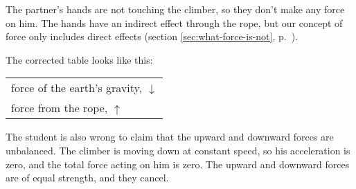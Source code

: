 The partner's hands are not touching the climber, so they don't make any force
on him. The hands have an indirect effect through the rope, but our concept of
force only includes direct effects (section \ref{sec:what-force-is-not}, p.~\pageref{sec:what-force-is-not}).

The corrected table looks like this:

\begin{tabular}{p{90mm}}
force of the earth's gravity, $\downarrow$ \\
force from the rope, $\uparrow$ \\
\end{tabular}

The student is also wrong to claim that the upward and downward forces are
unbalanced. The climber is moving down at constant speed, so his
acceleration is zero, and the total force acting on him is zero.
The upward and downward forces are of equal strength, and they
cancel.
